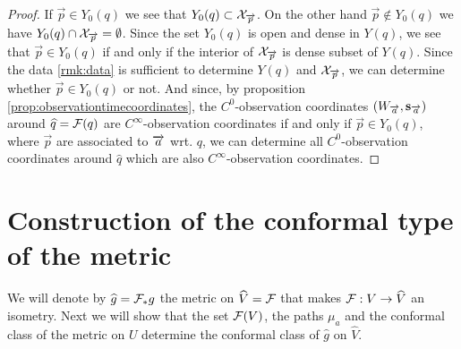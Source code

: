 \begin{proof}
    If $\overrightarrow{p}\in Y_0(q)$ we see that $Y_0(q) \subset \mc{X}_{\overrightarrow{p}}$. On the other hand $\overrightarrow{p}\notin Y_0(q)$ we have $Y_0(q) \cap \mc{X}_{\overrightarrow{p}} =\emptyset$. Since the set $Y_0(q)$ is open and dense in $Y(q)$, we see that $\overrightarrow{p}\in Y_0(q)$ if and only if the interior of $\mc{X}_{\overrightarrow{p}}$ is dense subset of $Y(q)$. Since the data \ref{rmk:data} is sufficient to determine $Y(q)$ and $\mc{X}_{\overrightarrow{p}}$, we can determine whether $\overrightarrow{p}\in Y_0(q)$ or not. And since, by proposition \ref{prop:observationtimecoordinates}, the $C^0$-observation coordinates $(W_\aa,\mathbf{s}_\aa)$ around $\widehat{q}=\F(q)$ are $C^\infty$-observation coordinates if and only if $\overrightarrow{p}\in Y_0(q)$, where $\overrightarrow{p}$ are associated to $\aa$ wrt. $q$, we can determine all $C^0$-observation coordinates around $\widehat{q}$ which are also $C^\infty$-observation coordinates.
\end{proof}

\section{Construction of the conformal type of the metric}
We will denote by $\widehat{g}=\F_*g$ the metric on $\widehat{V}=\F$ that makes $\F:V\to \widehat{V}$ an isometry. Next we will show that the set $\F(V)$, the paths $\mu_a$ and the conformal class of the metric on $U$ determine the conformal class of $\widehat{g}$ on $\widehat{V}$.

